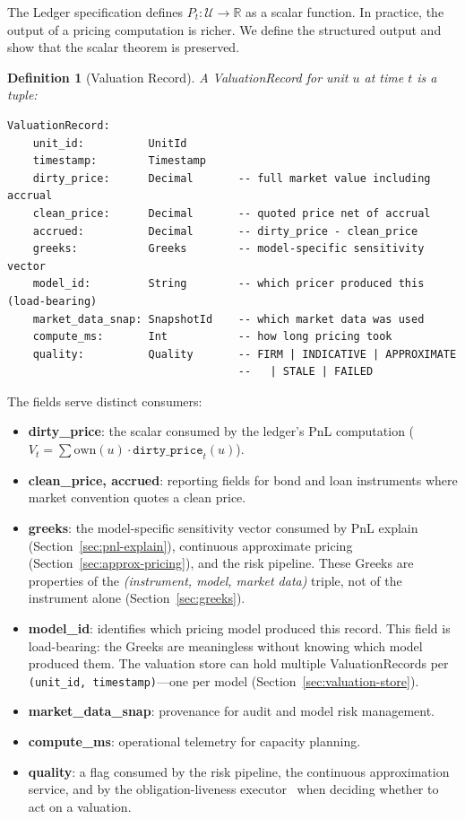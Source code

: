 \documentclass[11pt,a4paper]{article}
\newtheorem{definition}{Definition}[section]
\begin{document}
The Ledger specification defines $P_t : \mathcal{U} \to \mathbb{R}$ as a scalar function.  In practice, the output of a pricing computation is richer.  We define the structured output and show that the scalar theorem is preserved.

\begin{definition}[Valuation Record]
\label{def:valuation-record}
A \emph{ValuationRecord} for unit $u$ at time $t$ is a tuple:
\begin{lstlisting}
ValuationRecord:
    unit_id:          UnitId
    timestamp:        Timestamp
    dirty_price:      Decimal       -- full market value including accrual
    clean_price:      Decimal       -- quoted price net of accrual
    accrued:          Decimal       -- dirty_price - clean_price
    greeks:           Greeks        -- model-specific sensitivity vector
    model_id:         String        -- which pricer produced this (load-bearing)
    market_data_snap: SnapshotId    -- which market data was used
    compute_ms:       Int           -- how long pricing took
    quality:          Quality       -- FIRM | INDICATIVE | APPROXIMATE
                                    --   | STALE | FAILED
\end{lstlisting}
\end{definition}

\noindent The fields serve distinct consumers:

\begin{itemize}[nosep]
\item \textbf{dirty\_price}: the scalar consumed by the ledger's PnL computation ($V_t = \sum \mathrm{own}(u) \cdot \texttt{dirty\_price}_t(u)$).
\item \textbf{clean\_price, accrued}: reporting fields for bond and loan instruments where market convention quotes a clean price.
\item \textbf{greeks}: the model-specific sensitivity vector consumed by PnL explain (Section~\ref{sec:pnl-explain}), continuous approximate pricing (Section~\ref{sec:approx-pricing}), and the risk pipeline.  These Greeks are properties of the \emph{(instrument, model, market data)} triple, not of the instrument alone (Section~\ref{sec:greeks}).
\item \textbf{model\_id}: identifies which pricing model produced this record.  This field is load-bearing: the Greeks are meaningless without knowing which model produced them.  The valuation store can hold multiple ValuationRecords per \texttt{(unit\_id, timestamp)}---one per model (Section~\ref{sec:valuation-store}).
\item \textbf{market\_data\_snap}: provenance for audit and model risk management.
\item \textbf{compute\_ms}: operational telemetry for capacity planning.
\item \textbf{quality}: a flag consumed by the risk pipeline, the continuous approximation service, and by the obligation-liveness executor~\cite[\S14.7]{ledger} when deciding whether to act on a valuation.
\end{itemize}
\end{document}

